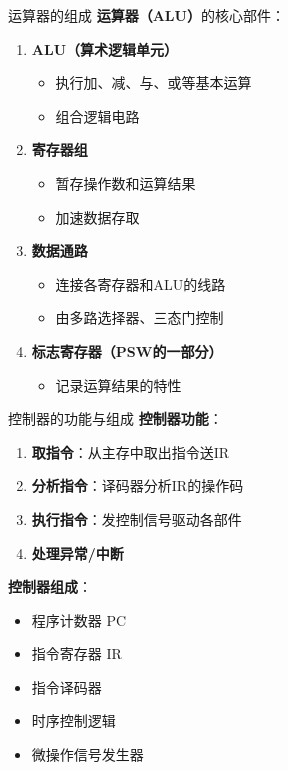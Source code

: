 \documentclass[10pt, aspectratio=169]{beamer}
\begin{document}
\begin{frame}{运算器的组成}
    \textbf{运算器（ALU）}的核心部件：
    \vspace{0.3em}
    \begin{enumerate}
        \item \textbf{ALU（算术逻辑单元）}
            \begin{itemize}
                \item 执行加、减、与、或等基本运算
                \item 组合逻辑电路
            \end{itemize}
        \item \textbf{寄存器组}
            \begin{itemize}
                \item 暂存操作数和运算结果
                \item 加速数据存取
            \end{itemize}
        \item \textbf{数据通路}
            \begin{itemize}
                \item 连接各寄存器和ALU的线路
                \item 由多路选择器、三态门控制
            \end{itemize}
        \item \textbf{标志寄存器（PSW的一部分）}
            \begin{itemize}
                \item 记录运算结果的特性
            \end{itemize}
    \end{enumerate}
\end{frame}

\begin{frame}{控制器的功能与组成}
    \textbf{控制器功能}：
    \begin{enumerate}
        \item \textbf{取指令}：从主存中取出指令送IR
        \item \textbf{分析指令}：译码器分析IR的操作码
        \item \textbf{执行指令}：发控制信号驱动各部件
        \item \textbf{处理异常/中断}
    \end{enumerate}
    \vspace{0.3em}
    \textbf{控制器组成}：
    \begin{itemize}
        \item 程序计数器 PC
        \item 指令寄存器 IR
        \item 指令译码器
        \item 时序控制逻辑
        \item 微操作信号发生器
    \end{itemize}
\end{frame}
\end{document}
